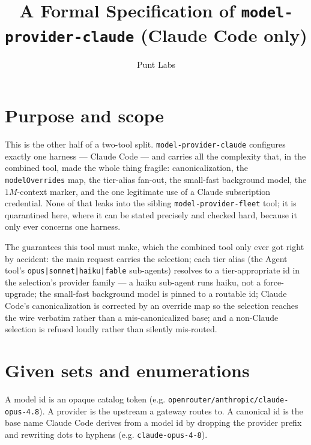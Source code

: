 \documentclass{article}
\begin{document}
\title{A Formal Specification of \texttt{model-provider-claude} (Claude Code only)}
\author{Punt Labs}
\maketitle

\section{Purpose and scope}

This is the other half of a two-tool split. \texttt{model-provider-claude}
configures exactly one harness --- Claude Code --- and carries all the
complexity that, in the combined tool, made the whole thing fragile:
canonicalization, the \texttt{modelOverrides} map, the tier-alias fan-out, the
small-fast background model, the $1M$-context marker, and the one legitimate use
of a Claude subscription credential. None of that leaks into the sibling
\texttt{model-provider-fleet} tool; it is quarantined here, where it can be
stated precisely and checked hard, because it only ever concerns one harness.

The guarantees this tool must make, which the combined tool only ever got right
by accident:
the main request carries the selection; each tier alias (the Agent tool's
\texttt{opus|sonnet|haiku|fable} sub-agents) resolves to a tier-appropriate id
in the selection's provider family --- a haiku sub-agent runs haiku, not a
force-upgrade; the small-fast background model is pinned to a routable id;
Claude Code's canonicalization is corrected by an override map so the selection
reaches the wire verbatim rather than a mis-canonicalized base; and a
non-Claude selection is refused loudly rather than silently mis-routed.

\section{Given sets and enumerations}

A model id is an opaque catalog token (e.g.
\texttt{openrouter/anthropic/claude-opus-4.8}). A provider is the upstream a
gateway routes to. A canonical id is the base name Claude Code derives from a
model id by dropping the provider prefix and rewriting dots to hyphens (e.g.
\texttt{claude-opus-4-8}).

\begin{zed}
\end{zed}
\end{document}
